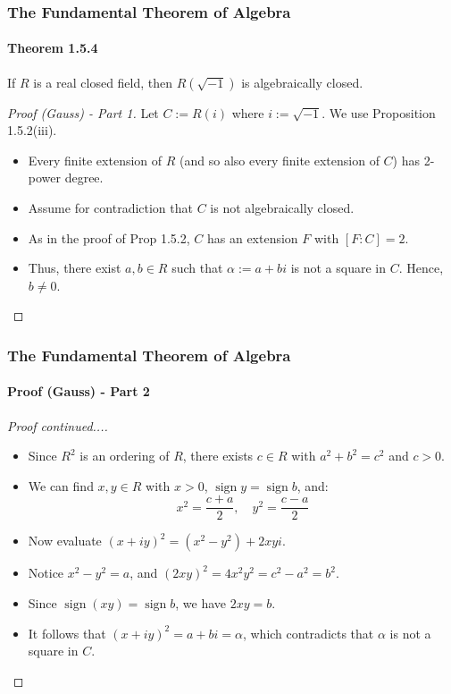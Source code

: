 \documentclass[11pt]{beamer}
\begin{document}
\begin{frame}
    \frametitle{The Fundamental Theorem of Algebra}
    \framesubtitle{Theorem 1.5.4}
    
    \begin{theorem}
        If $R$ is a real closed field, then $R(\sqrt{-1})$ is algebraically closed.
    \end{theorem}

    \vspace{0.4em}
    \begin{proof}[Proof (Gauss) - Part 1]
        Let $C := R(i)$ where $i := \sqrt{-1}$. We use Proposition 1.5.2(iii). 
        \begin{itemize}
            \item Every finite extension of $R$ (and so also every finite extension of $C$) has 2-power degree. 
            \item Assume for contradiction that $C$ is not algebraically closed. 
            \item As in the proof of Prop 1.5.2, $C$ has an extension $F$ with $[F : C] = 2$.
            \item Thus, there exist $a, b \in R$ such that $\alpha := a + bi$ is not a square in $C$. Hence, $b \neq 0$.
        \end{itemize}
    \end{proof}
\end{frame}

\begin{frame}
    \frametitle{The Fundamental Theorem of Algebra}
    \framesubtitle{Proof (Gauss) - Part 2}

    \begin{proof}[Proof continued...]
        \begin{itemize}
            \item Since $R^2$ is an ordering of $R$, there exists $c \in R$ with $a^2 + b^2 = c^2$ and $c > 0$.
            \item We can find $x, y \in R$ with $x > 0$, $\operatorname{sign} y = \operatorname{sign} b$, and:
            \[ x^2 = \frac{c + a}{2}, \quad y^2 = \frac{c - a}{2} \]
            \item Now evaluate $(x + iy)^2 = (x^2 - y^2) + 2xyi$.
            \item Notice $x^2 - y^2 = a$, and $(2xy)^2 = 4x^2y^2 = c^2 - a^2 = b^2$. 
            \item Since $\operatorname{sign}(xy) = \operatorname{sign} b$, we have $2xy = b$.
            \item It follows that $(x + iy)^2 = a + bi = \alpha$, which contradicts that $\alpha$ is not a square in $C$. \qedhere
        \end{itemize}
    \end{proof}
\end{frame}
\end{document}

